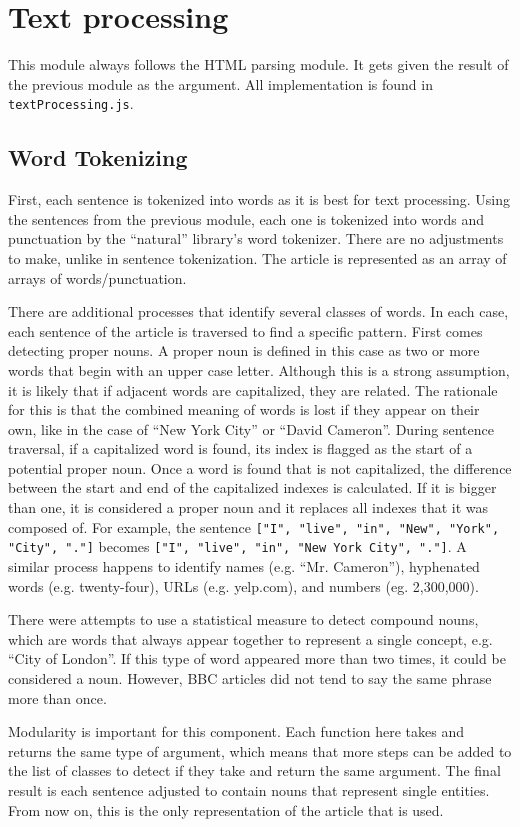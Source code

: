 \documentclass[11pt,titlepage]{report}
\begin{document}
\section{Text processing}
This module always follows the HTML parsing module. It gets given the result of the previous module as the argument. All implementation is found in \lstinline|textProcessing.js|.
\subsection{Word Tokenizing}
First, each sentence is tokenized into words as it is best for text processing. Using the sentences from the previous module, each one is tokenized into words and punctuation by the ``natural'' library's word tokenizer. There are no adjustments to make, unlike in sentence tokenization. The article is represented as an array of arrays of words/punctuation. 

There are additional processes that identify several classes of words. In each case, each sentence of the article is traversed to find a specific pattern. First comes detecting proper nouns. A proper noun is defined in this case as two or more words that begin with an upper case letter. Although this is a strong assumption, it is likely that if adjacent words are capitalized, they are related. The rationale for this is that the combined meaning of words is lost if they appear on their own, like in the case of ``New York City'' or ``David Cameron''. During sentence traversal, if a capitalized word is found, its index is flagged as the start of a potential proper noun. Once a word is found that is not capitalized, the difference between the start and end of the capitalized indexes is calculated. If it is bigger than one, it is considered a proper noun and it replaces all indexes that it was composed of. For example, the sentence \lstinline|["I", "live", "in", "New", "York", "City", "."]| becomes \lstinline|["I", "live", "in", "New York City", "."]|. A similar process happens to identify names (e.g. ``Mr. Cameron''), hyphenated words (e.g. twenty-four), URLs (e.g. yelp.com), and numbers (eg. 2,300,000). 

There were attempts to use a statistical measure to detect compound nouns, which are words that always appear together to represent a single concept, e.g. ``City of London''. If this type of word appeared more than two times, it could be considered a noun. However, BBC articles did not tend to say the same phrase more than once. 

Modularity is important for this component. Each function here takes and returns the same type of argument, which means that more steps can be added to the list of classes to detect if they take and return the same argument. The final result is each sentence adjusted to contain nouns that represent single entities. From now on, this is the only representation of the article that is used.
\end{document}
